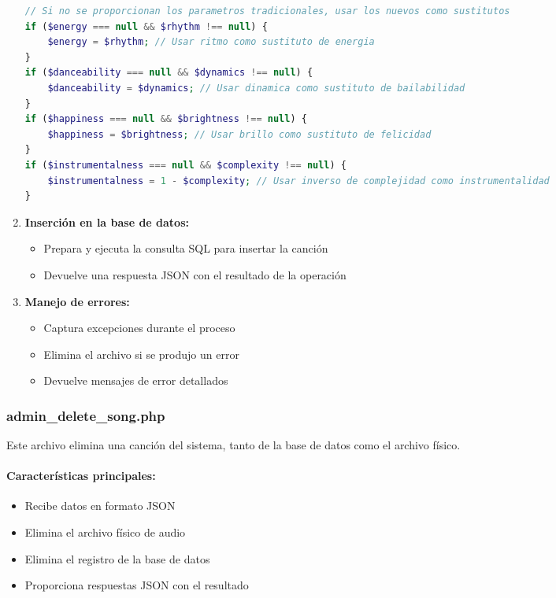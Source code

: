 \documentclass[a4paper,12pt]{article}
\begin{document}
\begin{enumerate}
    \begin{lstlisting}[language=PHP]
// Si no se proporcionan los parametros tradicionales, usar los nuevos como sustitutos
if ($energy === null && $rhythm !== null) {
    $energy = $rhythm; // Usar ritmo como sustituto de energia
}
if ($danceability === null && $dynamics !== null) {
    $danceability = $dynamics; // Usar dinamica como sustituto de bailabilidad
}
if ($happiness === null && $brightness !== null) {
    $happiness = $brightness; // Usar brillo como sustituto de felicidad
}
if ($instrumentalness === null && $complexity !== null) {
    $instrumentalness = 1 - $complexity; // Usar inverso de complejidad como instrumentalidad
}
    \end{lstlisting}
    
    \item \textbf{Inserción en la base de datos:}
    \begin{itemize}
        \item Prepara y ejecuta la consulta SQL para insertar la canción
        \item Devuelve una respuesta JSON con el resultado de la operación
    \end{itemize}
    
    \item \textbf{Manejo de errores:}
    \begin{itemize}
        \item Captura excepciones durante el proceso
        \item Elimina el archivo si se produjo un error
        \item Devuelve mensajes de error detallados
    \end{itemize}
\end{enumerate}

\subsubsection{admin\_delete\_song.php}
Este archivo elimina una canción del sistema, tanto de la base de datos como el archivo físico.

\paragraph{Características principales:}
\begin{itemize}
    \item Recibe datos en formato JSON
    \item Elimina el archivo físico de audio
    \item Elimina el registro de la base de datos
    \item Proporciona respuestas JSON con el resultado
\end{itemize}
\end{document}
